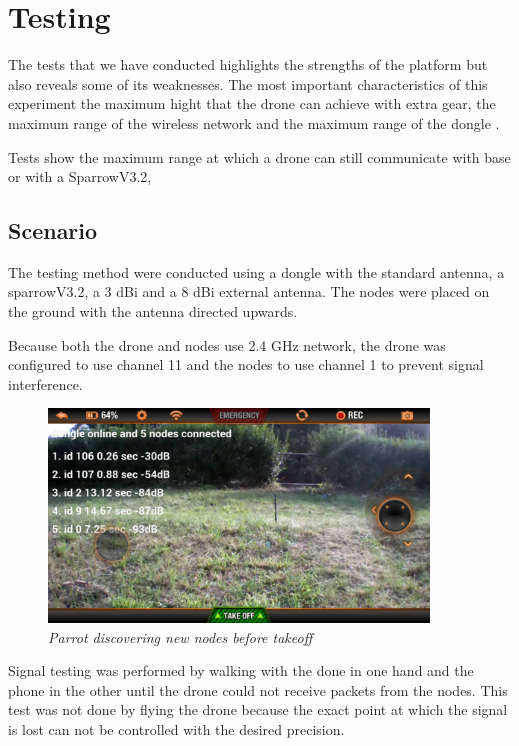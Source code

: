 \normalfont\normalsize
\chapter{Testing}

The tests that we have conducted highlights the strengths of the platform but also reveals some of its weaknesses.
The most important characteristics of this experiment the maximum hight that the drone  can achieve with extra gear, the maximum range of the wireless network and the maximum range of the dongle .

Tests show the maximum range at which a drone can still communicate with base or with a SparrowV3.2,


\section{Scenario}

The testing method were conducted using a dongle with the standard antenna, a sparrowV3.2, a 3 dBi and a 8 dBi external antenna. The nodes were placed on the ground with the antenna directed upwards.

Because both the drone and nodes use 2.4 GHz network, the drone was configured to use channel 11 and the nodes to use channel 1 to prevent signal interference.

\begin{figure}[ht]
\begin{center}
\includegraphics[width=0.9\textwidth]{img/parrot_test.png}
\end{center}
\caption{\small \itshape{Parrot discovering new nodes before takeoff}}
\end{figure}

Signal testing was performed by walking with the done in one hand and the phone in the other until the drone could not receive packets from the nodes. This test was not done by flying the drone because the exact point at which the signal is lost can not be controlled with the desired precision.



